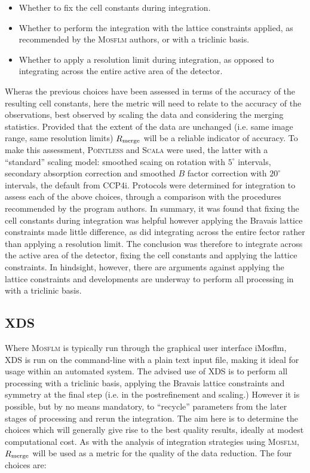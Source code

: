 \documentclass[preprint,pdf]{iucr}
\begin{document}
\begin{itemize}
\item{Whether to fix the cell constants during integration.}
\item{Whether to perform the integration with the lattice constraints
    applied, as recommended by the \textsc{Mosflm} authors, or with a triclinic
    basis.}
\item{Whether to apply a resolution limit during integration,
    as opposed to integrating across the entire active area of the detector.}
\end{itemize}

Wheras the previous choices have been assessed in terms of the accuracy
of the resulting cell constants, here the metric will need to relate
to the accuracy of the observations, best observed by scaling the data
and considering the merging statistics. Provided that the extent of
the data are unchanged (i.e. same image range, same resolution limits)
$R_{\rm{merge}}$ will be a reliable indicator of accuracy. To make
this assessment, \textsc{Pointless} \cite{Evans:ba5084} and \textsc{Scala} were
used, the latter with a ``standard'' scaling model: smoothed
scaing on rotation with $5^{\circ}$ intervals, secondary absorption
correction and smoothed $B$ factor correction with $20^{\circ}$
intervals, the default from CCP4i.
Protocols were determined for integration to assess each
of the above choices, through a 
comparison with the procedures recommended
by the program authors. In summary, it was found that fixing the cell
constants during integration was helpful however applying the Bravais
lattice constraints made little difference, as did integrating across
the entire fector rather than applying a resolution limit.
The conclusion was therefore to integrate across the
active area of the detector, fixing the cell constants and applying
the lattice constraints. In hindsight, however, there are arguments
against applying the lattice constraints
and developments are underway to perform all
processing in with a triclinic basis.

\subsection{XDS}

Where \textsc{Mosflm} is typically run through the graphical user interface
iMosflm, XDS is run on the command-line with a plain text input file,
making it ideal for usage 
within an automated system. The advised use of XDS is to perform all
processing with a triclinic basis, applying the Bravais lattice
constraints and symmetry
at the final step (i.e. in the postrefinement and scaling.) However it
is possible, but by no means mandatory, to ``recycle'' parameters from
the later stages of processing and rerun the integration. The aim here
is to determine the choices which will generally give rise to the best
quality results, ideally at modest computational cost. As with the
analysis of integration strategies using \textsc{Mosflm}, $R_{\rm{merge}}$ will
be used as a metric for the quality of the data reduction. The four
choices are:
\end{document}

